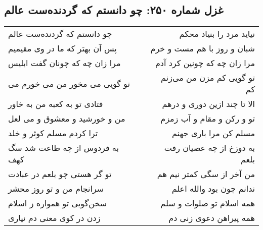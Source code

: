 \begin{center}
\section*{غزل شماره ۲۵۰: چو دانستم که گردنده‌ست عالم}
\label{sec:250}
\begin{longtable}{l p{0.5cm} r}
چو دانستم که گردنده‌ست عالم
&&
نیاید مرد را بنیاد محکم
\\
پس آن بهتر که ما در وی مقیمیم
&&
شبان و روز با هم مست و خرم
\\
مرا زان چه که چونان گفت ابلیس
&&
مرا زان چه که چونین کرد آدم
\\
تو گویی می مخور من می خورم می
&&
تو گویی کم مزن من می‌زنم کم
\\
فتادی تو به کعبه من به خاور
&&
الا تا چند ازین دوری و درهم
\\
من و خورشید و معشوق و می لعل
&&
تو و رکن و مقام و آب زمزم
\\
ترا کردم مسلم کوثر و خلد
&&
مسلم کن مرا باری جهنم
\\
به فردوس از چه طاعت شد سگ کهف
&&
به دوزخ از چه عصیان رفت بلعم
\\
تو گر هستی چو بلعم در عبادت
&&
من آخر از سگی کمتر نیم هم
\\
سرانجام من و تو روز محشر
&&
ندانم چون بود والله اعلم
\\
سخن‌گویی تو همواره ز اسلام
&&
همه اسلام تو صلوات و سلم
\\
زدن در کوی معنی دم نیاری
&&
همه پیراهن دعوی زنی دم
\\
\end{longtable}
\end{center}
